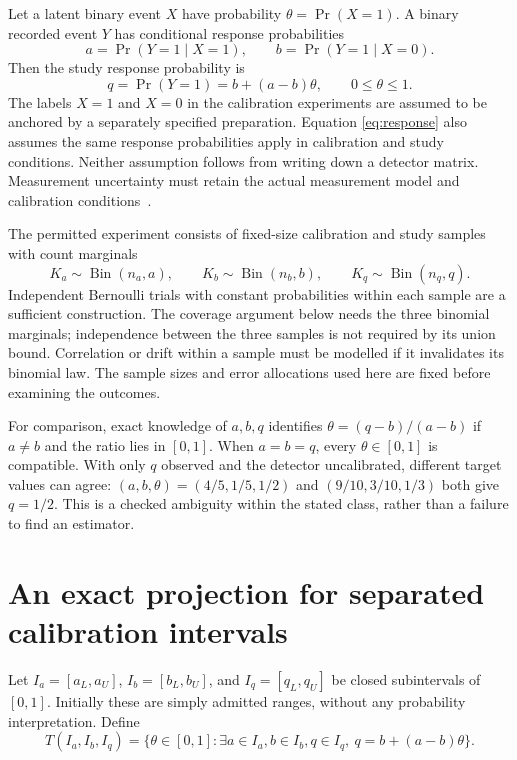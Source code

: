 \documentclass[11pt]{article}
\begin{document}
Let a latent binary event $X$ have probability $\theta=\Pr(X=1)$. A binary recorded event $Y$ has conditional response probabilities
\[
 a=\Pr(Y=1\mid X=1),\qquad b=\Pr(Y=1\mid X=0).
\]
Then the study response probability is
\begin{equation}
 q=\Pr(Y=1)=b+(a-b)\theta,\qquad 0\le\theta\le1.
 \label{eq:response}
\end{equation}
The labels $X=1$ and $X=0$ in the calibration experiments are assumed to be anchored by a separately specified preparation. Equation \eqref{eq:response} also assumes the same response probabilities apply in calibration and study conditions. Neither assumption follows from writing down a detector matrix. Measurement uncertainty must retain the actual measurement model and calibration conditions~\cite{gum}.

The permitted experiment consists of fixed-size calibration and study samples with count marginals
\begin{equation}
 K_a\sim\operatorname{Bin}(n_a,a),\qquad
 K_b\sim\operatorname{Bin}(n_b,b),\qquad
 K_q\sim\operatorname{Bin}(n_q,q).
 \label{eq:binomial}
\end{equation}
Independent Bernoulli trials with constant probabilities within each sample are a sufficient construction. The coverage argument below needs the three binomial marginals; independence between the three samples is not required by its union bound. Correlation or drift within a sample must be modelled if it invalidates its binomial law. The sample sizes and error allocations used here are fixed before examining the outcomes.

For comparison, exact knowledge of $a,b,q$ identifies $\theta=(q-b)/(a-b)$ if $a\ne b$ and the ratio lies in $[0,1]$. When $a=b=q$, every $\theta\in[0,1]$ is compatible. With only $q$ observed and the detector uncalibrated, different target values can agree: $(a,b,\theta)=(4/5,1/5,1/2)$ and $(9/10,3/10,1/3)$ both give $q=1/2$. This is a checked ambiguity within the stated class, rather than a failure to find an estimator.

\section{An exact projection for separated calibration intervals}

Let $I_a=[a_L,a_U]$, $I_b=[b_L,b_U]$, and $I_q=[q_L,q_U]$ be closed subintervals of $[0,1]$. Initially these are simply admitted ranges, without any probability interpretation. Define
\[
 T(I_a,I_b,I_q)=\{\theta\in[0,1]:\exists a\in I_a,b\in I_b,q\in I_q,
                              \ q=b+(a-b)\theta\}.
\]
\end{document}
